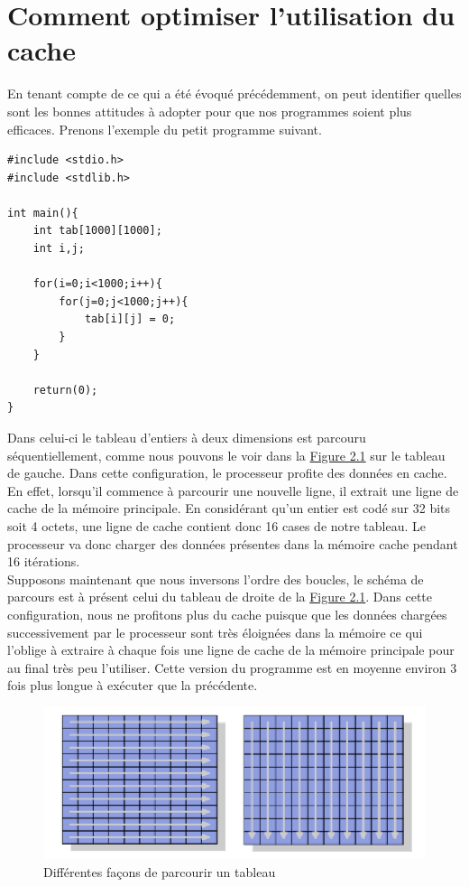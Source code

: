 \section{Comment optimiser l'utilisation du cache}\label{Section:2.2}

En tenant compte  de ce qui a été évoqué précédemment, on peut identifier quelles sont les bonnes attitudes à adopter pour que nos programmes soient plus efficaces. Prenons l'exemple du petit programme suivant. 


\begin{DDbox}{\linewidth}
\begin{lstlisting}
#include <stdio.h>
#include <stdlib.h>

int main(){
	int tab[1000][1000];
	int i,j;

	for(i=0;i<1000;i++){
		for(j=0;j<1000;j++){
			tab[i][j] = 0;
		}
	}

	return(0);
}
\end{lstlisting}
\end{DDbox}

Dans celui-ci le tableau d'entiers à deux dimensions est parcouru séquentiellement, comme nous pouvons le voir dans la \hyperref[figure:2.1]{Figure 2.1} sur le tableau de gauche. Dans cette configuration, le processeur profite des données en cache. En effet, lorsqu'il commence à parcourir une nouvelle ligne, il extrait une ligne de cache de la mémoire principale. En considérant qu'un entier est codé sur 32 bits soit 4 octets, une ligne de cache contient donc 16 cases de notre tableau. Le processeur va donc charger des données présentes dans la mémoire cache pendant 16 itérations. \\
Supposons maintenant que nous inversons l'ordre des boucles, le schéma de parcours est à présent celui du tableau de droite de la \hyperref[figure:2.1]{Figure 2.1}. Dans cette configuration, nous ne profitons plus du cache puisque que les données chargées successivement par le processeur sont très éloignées dans la mémoire ce qui l'oblige à extraire à chaque fois une ligne de cache de la mémoire principale pour au final très peu l'utiliser. Cette version du programme est en moyenne environ 3 fois plus longue à exécuter que la précédente. 

\begin{figure}[ht]

	\begin{center}
	\includegraphics[scale=0.7]{tableaux.png} 
	\end{center}
	\caption{Différentes façons de parcourir un tableau}
	\label{figure:2.1}

\end{figure}


